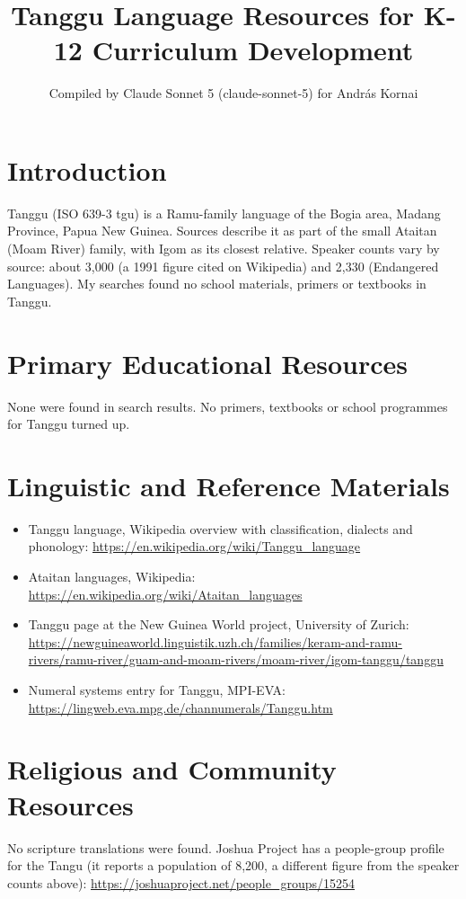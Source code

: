 \documentclass[12pt]{article}
\title{Tanggu Language Resources for K-12 Curriculum Development}
\author{Compiled by Claude Sonnet 5 (claude-sonnet-5) for Andr\'as Kornai}
\date{}
\begin{document}
\maketitle

\section{Introduction}
Tanggu (ISO 639-3 tgu) is a Ramu-family language of the Bogia area, Madang Province, Papua New Guinea. Sources describe it as part of the small Ataitan (Moam River) family, with Igom as its closest relative. Speaker counts vary by source: about 3,000 (a 1991 figure cited on Wikipedia) and 2,330 (Endangered Languages). My searches found no school materials, primers or textbooks in Tanggu.

\section{Primary Educational Resources}
None were found in search results. No primers, textbooks or school programmes for Tanggu turned up.

\section{Linguistic and Reference Materials}
\begin{itemize}
\item Tanggu language, Wikipedia overview with classification, dialects and phonology: \url{https://en.wikipedia.org/wiki/Tanggu_language}
\item Ataitan languages, Wikipedia: \url{https://en.wikipedia.org/wiki/Ataitan_languages}
\item Tanggu page at the New Guinea World project, University of Zurich: \url{https://newguineaworld.linguistik.uzh.ch/families/keram-and-ramu-rivers/ramu-river/guam-and-moam-rivers/moam-river/igom-tanggu/tanggu}
\item Numeral systems entry for Tanggu, MPI-EVA: \url{https://lingweb.eva.mpg.de/channumerals/Tanggu.htm}
\end{itemize}

\section{Religious and Community Resources}
No scripture translations were found. Joshua Project has a people-group profile for the Tangu (it reports a population of 8,200, a different figure from the speaker counts above): \url{https://joshuaproject.net/people_groups/15254}
\end{document}
